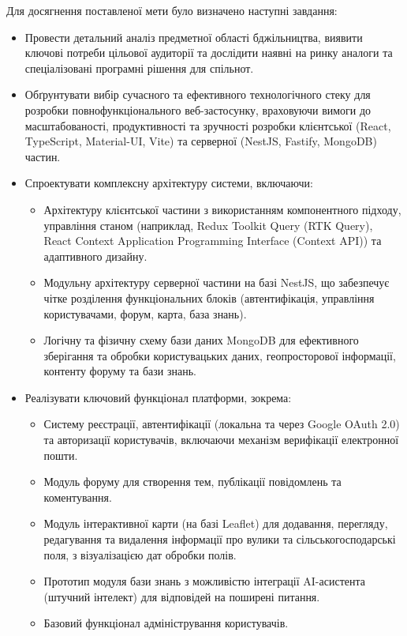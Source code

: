 Для досягнення поставленої мети було визначено наступні завдання:
\begin{itemize}
    \item Провести детальний аналіз предметної області бджільництва, виявити ключові потреби цільової аудиторії та дослідити наявні на ринку аналоги та спеціалізовані програмні рішення для спільнот.
    \item Обґрунтувати вибір сучасного та ефективного технологічного стеку для розробки повнофункціонального веб-застосунку, враховуючи вимоги до масштабованості, продуктивності та зручності розробки клієнтської (React, TypeScript, Material-UI, Vite) та серверної (NestJS, Fastify, MongoDB) частин.
    \item Спроектувати комплексну архітектуру системи, включаючи:
        \begin{itemize}
            \item Архітектуру клієнтської частини з використанням компонентного підходу, управління станом (наприклад, Redux Toolkit Query (RTK Query), React Context Application Programming Interface (Context API)) та адаптивного дизайну.
            \item Модульну архітектуру серверної частини на базі NestJS, що забезпечує чітке розділення функціональних блоків (автентифікація, управління користувачами, форум, карта, база знань).
            \item Логічну та фізичну схему бази даних MongoDB для ефективного зберігання та обробки користувацьких даних, геопросторової інформації, контенту форуму та бази знань.
        \end{itemize}
    \item Реалізувати ключовий функціонал платформи, зокрема:
        \begin{itemize}
            \item Систему реєстрації, автентифікації (локальна та через Google OAuth 2.0) та авторизації користувачів, включаючи механізм верифікації електронної пошти.
            \item Модуль форуму для створення тем, публікації повідомлень та коментування.
            \item Модуль інтерактивної карти (на базі Leaflet) для додавання, перегляду, редагування та видалення інформації про вулики та сільськогосподарські поля, з візуалізацією дат обробки полів.
            \item Прототип модуля бази знань з можливістю інтеграції AI-асистента (штучний інтелект) для відповідей на поширені питання.
            \item Базовий функціонал адміністрування користувачів.

\end{itemize}
\end{itemize}
